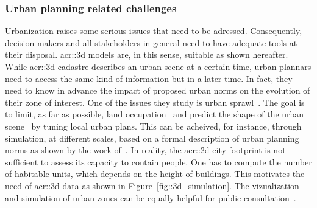         \subsubsection{Urban planning related challenges}
            Urbanization raises some serious issues that need to be adressed.
            Consequently, decision makers and all stakeholders in general need to have adequate tools at their disposal.
            \gls{acr::3d} models are, in this sense, suitable as shown hereafter.\\
            While \gls{acr::3d} cadastre describes an urban scene at a certain time, urban plannars need to access the same kind of information but in a later time.
            In fact, they need to know in advance the impact of proposed urban norms on the evolution of their zone of interest. 
            One of the issues they study is urban sprawl~\parencite{ludlow2006urban}.
            The goal is to limit, as far as possible, land occupation~\parencite{tannier2012assessing} and predict the shape of the urban scene~\parencite{brasebin20183d} by tuning local urban plans.
            This can be acheived, for instance, through simulation, at different scales, based on a formal description of urban planning norms as shown by the work of~\textcite{colomb2017simulation}.
            In reality, the \gls{acr::2d} city footprint is not sufficient to assess its capacity to contain people.
            One has to compute the number of habitable units, which depends on the height of buildings.
            This motivates the need of \gls{acr::3d} data as shown in Figure~\ref{fig::3d_simulation}.
            The  vizualization and simulation of urban zones can be equally helpful for public consultation~\parencite{wu2010virtual}.\\

